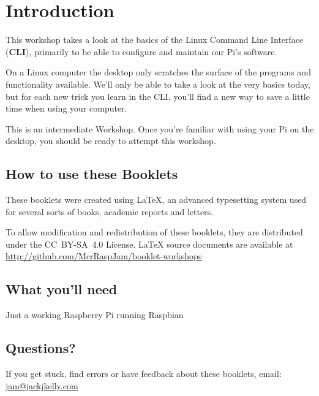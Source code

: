 \setcounter{section}{-1}
\section{Introduction}
	
	This workshop takes a look at the basics of the Linux Command Line Interface (\textbf{CLI}), primarily to be able to configure and maintain our Pi's software.
	
	On a Linux computer the desktop only scratches the surface of the programs and functionality available. We'll only be able to take a look at the very basics today, but for each new trick you learn in the CLI, you'll find a new way to save a little time when using your computer.

	This is an intermediate Workshop. Once you're familiar with using your Pi on the desktop, you should be ready to attempt this workshop.
		
	\subsection*{How to use these Booklets}
	
	
	
		
	These booklets were created using {\selectfont \LaTeX}, an advanced typesetting system used for several sorts of books, academic reports and letters.
		
	To allow modification and redistribution of these booklets, they are distributed under the \hbox{CC BY-SA 4.0} License. LaTeX source documents are available at \url{http://github.com/McrRaspJam/booklet-workshops}
	
	
	
	\subsection*{What you'll need}
		
		Just a working Raspberry Pi running Raspbian
		
	\subsection*{Questions?}
		If you get stuck, find errors or have feedback about these booklets, email:
		\url{jam@jackjkelly.com}\label{email}